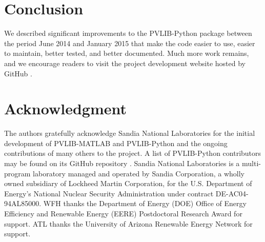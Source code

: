 \documentclass[conference]{IEEEtran}
\begin{document}
\section{Conclusion}
We described significant improvements to the PVLIB-Python package between the period June 2014 and January 2015 that make the code easier to use, easier to maintain, better tested, and better documented. 
Much more work remains, and we encourage readers to visit the project development website hosted by GitHub \cite{pvlib-github}.


\section*{Acknowledgment}
The authors gratefully acknowledge Sandia National Laboratories for the initial development of PVLIB-MATLAB and PVLIB-Python and the ongoing contributions of many others to the project.
A list of PVLIB-Python contributors may be found on its GitHub repository \cite{pvlib-github}.
Sandia National Laboratories is a multi-program laboratory managed and operated by Sandia Corporation, a wholly owned subsidiary of Lockheed Martin Corporation, for the U.S. Department of Energy's National Nuclear Security Administration under contract DE-AC04-94AL85000.
WFH thanks the Department of Energy (DOE) Office of Energy Efficiency and Renewable Energy (EERE) Postdoctoral Research Award for support. 
ATL thanks the University of Arizona Renewable Energy Network for support.

\vfil\eject







\end{document}
